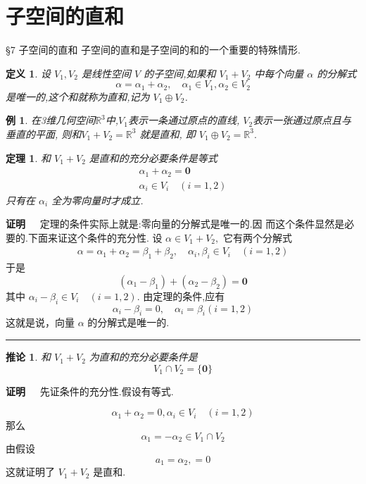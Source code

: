 \documentclass[13pt]{beamer}
\newtheorem{thm}{定理}
\newtheorem{exa}{例}
\newtheorem*{defi}{定义}
\newtheorem*{coro}{推论}
\def\qed{\nopagebreak\hfill{\rule{4pt}{7pt}}\medbreak}
\def\pf{{\bf 证明~~ }}
\def\R{\mathbb{R}}
\def\0{\mathbf{0}}
\begin{document}
\section{子空间的直和}
\begin{frame}{\S 7 子空间的直和}
子空间的直和是子空间的和的一个重要的特殊情形.  

\begin{defi}
设 $V_{1}, V_{2}$ 是线性空间 $V$ 的子空间,如果和 $V_{1}+V_{2}$ 中每个向量 $\alpha$ 的分解式
\[
{\alpha}={\alpha}_{1}+{\alpha}_{2}, \quad {\alpha}_{1} \in V_{1}, {\alpha}_{2} \in V_{2}
\]
是唯一的,这个和就称为直和,记为 $V_{1} \oplus V_{2}$.
\end{defi} 

\begin{exa}
在3维几何空间$\R^3$中,$V_1$表示一条通过原点的直线, $V_2$表示一张通过原点且与垂直的平面, 则和$V_1+V_2=\R^3$ 就是直和, 即
                 $V_1 \oplus V_2= \R^3.$
\end{exa}

\end{frame}

\begin{frame}
\small{
\begin{thm}
和 $V_{1}+V_{2}$ 是直和的充分必要条件是等式
\[
\begin{array}{c}
{\alpha}_{1}+{\alpha}_{2}={\0} \\
{\alpha}_{i} \in V_{i} \quad(i=1,2)
\end{array}
\]
只有在 ${\alpha}_{i}$ 全为零向量时才成立. 
\end{thm} 

\pf 定理的条件实际上就是:零向量的分解式是唯一的.因 而这个条件显然是必要的.下面来证这个条件的充分性.  设 ${\alpha} \in V_{1}+V_{2},$ 它有两个分解式
\[
\begin{array}{c}
{\alpha}={\alpha}_{1}+{\alpha}_{2}={\beta}_{1}+{\beta}_{2}, \quad {\alpha}_{i}, {\beta}_{i} \in V_{i} \quad(i=1,2)
\end{array}
\]
于是
\[
\left({\alpha}_{1}-{\beta}_{1}\right)+\left({\alpha}_{2}-{\beta}_{2}\right)=\mathbf{0}
\]
其中 ${\alpha}_{i}-{\beta_i} \in V_{i}\quad (i=1,2) .$ 由定理的条件,应有
\[
{\alpha}_{i}-{\beta}_{i}={0}, \quad {\alpha}_{i}={\beta}_{i}(i=1,2)
\]
这就是说，向量 ${\alpha}$ 的分解式是唯一的. }\qed
\end{frame}

\begin{frame}
\begin{coro}
和 $V_{1}+V_{2}$ 为直和的充分必要条件是
\[
V_{1} \cap V_{2}=\{\mathbf{0}\}
\]
\end{coro}
\pf 先证条件的充分性.假设有等式.

\[
{\alpha}_{1}+{\alpha}_{2}={0}, {\alpha}_{i} \in V_{i} \quad(i=1,2)
\]
那么
\[
{\alpha}_{1}=-{\alpha}_{2} \in V_{1} \cap V_{2}
\]
由假设
\[
{a}_{1}={\alpha}_{2},={0}
\]
这就证明了 $V_{1}+V_{2}$ 是直和.
\end{frame}
\end{document}
